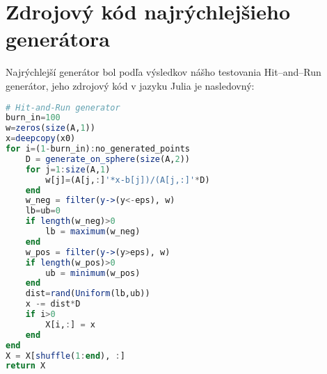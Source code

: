 \chapter*{Zdrojový kód najrýchlejšieho generátora}

Najrýchlejší generátor bol podľa výsledkov nášho testovania Hit--and--Run generátor, jeho zdrojový kód v jazyku Julia je nasledovný:
\begin{lstlisting}[language=Julia]
# Hit-and-Run generator
burn_in=100
w=zeros(size(A,1))
x=deepcopy(x0)
for i=(1-burn_in):no_generated_points
    D = generate_on_sphere(size(A,2))
    for j=1:size(A,1)
        w[j]=(A[j,:]'*x-b[j])/(A[j,:]'*D)
    end
    w_neg = filter(y->(y<-eps), w)
    lb=ub=0
    if length(w_neg)>0
        lb = maximum(w_neg)
    end
    w_pos = filter(y->(y>eps), w)
    if length(w_pos)>0
        ub = minimum(w_pos)
    end
    dist=rand(Uniform(lb,ub))
    x -= dist*D
    if i>0
        X[i,:] = x
    end
end
X = X[shuffle(1:end), :]
return X
\end{lstlisting}
